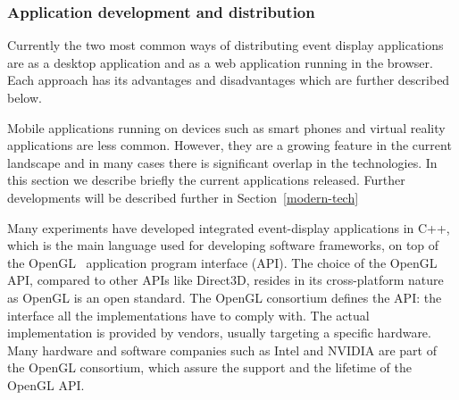\documentclass[12pt,a4paper]{article}
\begin{document}


\hypertarget{application-development}{%
\subsubsection{Application development and distribution}\label{application-development}}

Currently the two most common ways of distributing event display applications are as a desktop application and as a web
application running in the browser. Each approach has its advantages and disadvantages which are further described below.

Mobile applications running on devices such as smart phones and virtual reality applications are less common. However,
they are a growing feature in the current landscape and in many cases there is significant overlap in the technologies.
In this section we describe briefly the current applications released. Further developments will be described further in
Section~\ref{modern-tech}

Many experiments have developed integrated event-display applications in C++, which is the main language used for developing
software frameworks, on top of the OpenGL~\cite{OpenGL1992} application program interface (API).
The choice of the OpenGL API, compared to other APIs like Direct3D, resides in its cross-platform nature as
OpenGL is an open standard. The OpenGL consortium defines the API: the interface all the implementations have to
comply with. The actual implementation is provided by vendors, usually targeting a specific hardware. Many hardware and
software companies such as Intel and NVIDIA are part of the OpenGL consortium, which assure
the support and the lifetime of the OpenGL API.
\end{document}
